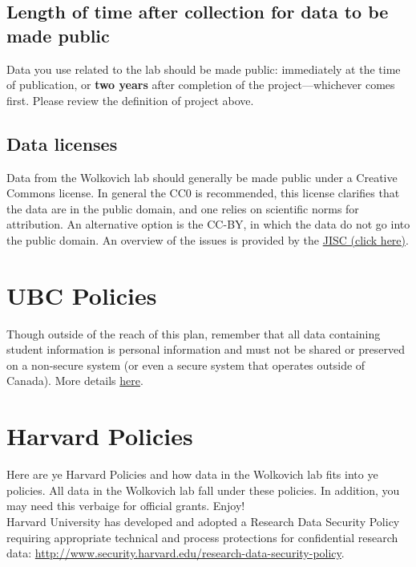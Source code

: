 \documentclass[11pt,a4paper,oneside]{article}
\begin{document}
\subsection{Length of time after collection for data to be made public}
Data you use related to the lab should be made public: immediately at the time of publication, or {\bf two years} after completion of the project---whichever comes first. Please review the definition of project above. 
	
\subsection{Data licenses}
Data from the Wolkovich lab should generally be made public under a Creative Commons license. In general the CC0 is recommended, this license clarifies that the data are in the public domain, and one relies on scientific norms for attribution.  An alternative option is the CC-BY, in which the data do not go into the public domain. An overview of the issues is provided by the \href{http://discovery.ac.uk/files/pdf/Licensing_Open_Data_A_Practical_Guide.pdf}{JISC (click here)}. 

\section{UBC Policies}

Though outside of the reach of this plan, remember that all data containing student information is personal information and must not be shared or preserved on a non-secure system (or even a secure system that operates outside of Canada). More details \href{https://facultystaff.students.ubc.ca/enrolment-services/scheduling-records-systems-management/student-systems-management/data-security}{here}.

\section{Harvard Policies}
Here are ye Harvard Policies and how data in the Wolkovich lab fits into ye policies. All data in the Wolkovich lab fall under these policies. In addition, you may need this verbaige for official grants. Enjoy!\\

\noindent Harvard University has developed and adopted a Research Data Security Policy requiring appropriate technical and process protections for confidential research data: \url{http://www.security.harvard.edu/research-data-security-policy}. \\
\end{document}
